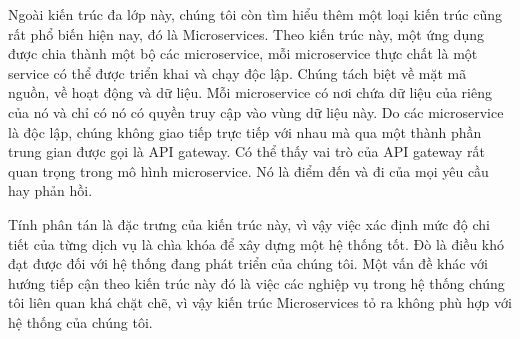 \par
Ngoài kiến trúc đa lớp này, chúng tôi còn tìm hiểu thêm một loại kiến trúc cũng
rất phổ biến hiện nay, đó là Microservices. Theo kiến trúc này, một ứng dụng
được chia thành một bộ các microservice, mỗi microservice thực chất là một
service có thể được triển khai và chạy độc lập. Chúng tách biệt về mặt mã
nguồn, về hoạt động và dữ liệu. Mỗi microservice có nơi chứa dữ liệu của riêng
của nó và chỉ có nó có quyền truy cập vào vùng dữ liệu này. Do các microservice
là độc lập, chúng không giao tiếp trực tiếp với nhau mà qua một thành phần
trung gian được gọi là API gateway. Có thể thấy vai trò của API gateway rất
quan trọng trong mô hình microservice. Nó là điểm đến và đi của mọi yêu cầu hay
phản hồi.
\par
Tính phân tán là đặc trưng của kiến trúc này, vì vậy việc xác định mức độ chi
tiết của từng dịch vụ là chìa khóa để xây dựng một hệ thống tốt. Đò là điều khó
đạt được đối với hệ thống đang phát triển của chúng tôi. Một vấn đề khác với
hướng tiếp cận theo kiến trúc này đó là việc các nghiệp vụ trong hệ thống chúng
tôi liên quan khá chặt chẽ, vì vậy kiến trúc Microservices tỏ ra không phù hợp
với hệ thống của chúng tôi.